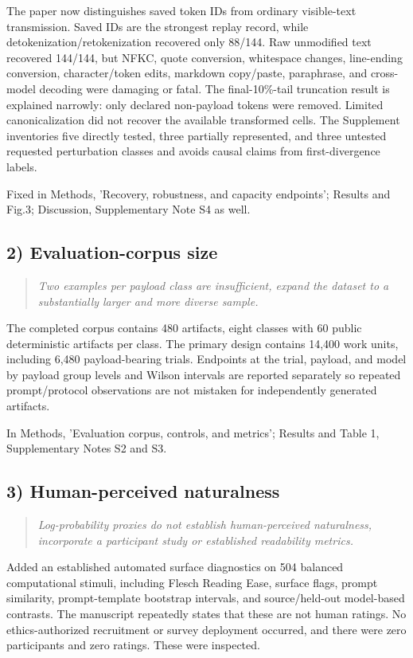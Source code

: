 \documentclass[11pt]{article}
\newenvironment{reviewcomment}{\begin{quote}\color{commentgray}\itshape}{\end{quote}}
\begin{document}
The paper now distinguishes saved token IDs from ordinary visible-text transmission. Saved IDs are the strongest replay record, while detokenization/retokenization recovered only 88/144. Raw unmodified text recovered 144/144, but NFKC, quote conversion, whitespace changes, line-ending conversion, character/token edits, markdown copy/paste, paraphrase, and cross-model decoding were damaging or fatal. The final-10\%-tail truncation result is explained narrowly: only declared non-payload tokens were removed. Limited canonicalization did not recover the available transformed cells. The Supplement inventories five directly tested, three partially represented, and three untested requested perturbation classes and avoids causal claims from first-divergence labels.

Fixed in Methods, 'Recovery, robustness, and capacity endpoints'; Results and Fig.3; Discussion, Supplementary Note S4 as well.

\subsection*{2) Evaluation-corpus size}
\begin{reviewcomment}
Two examples per payload class are insufficient, expand the dataset to a substantially larger and more diverse sample.
\end{reviewcomment}

The completed corpus contains 480 artifacts, eight classes with 60 public deterministic artifacts per class. The primary design contains 14,400 work units, including 6,480 payload-bearing trials. Endpoints at the trial, payload, and model by payload group levels and Wilson intervals are reported separately so repeated prompt/protocol observations are not mistaken for independently generated artifacts.

In Methods, 'Evaluation corpus, controls, and metrics'; Results and Table 1, Supplementary Notes S2 and S3.

\subsection*{3) Human-perceived naturalness}
\begin{reviewcomment}
Log-probability proxies do not establish human-perceived naturalness, incorporate a participant study or established readability metrics.
\end{reviewcomment}

Added an established automated surface diagnostics on 504 balanced computational stimuli, including Flesch Reading Ease, surface flags, prompt similarity, prompt-template bootstrap intervals, and source/held-out model-based contrasts. The manuscript repeatedly states that these are not human ratings. No ethics-authorized recruitment or survey deployment occurred, and there were zero participants and zero ratings. These were inspected.
\end{document}
